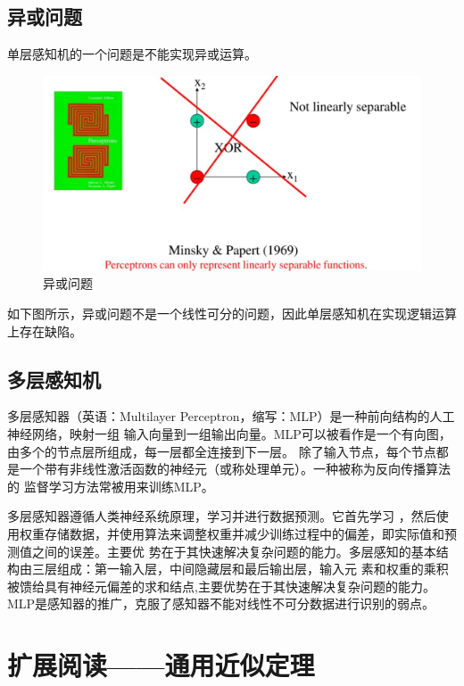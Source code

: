 \section{异或问题}

单层感知机的一个问题是不能实现异或运算。

\begin{figure}[H]
    \centering
    \includegraphics[scale=0.2]{figures/xor.png}
    \caption{异或问题}
\end{figure}

如下图所示，异或问题不是一个线性可分的问题，因此单层感知机在实现逻辑运算上存在缺陷。


\section{多层感知机}

多层感知器（英语：Multilayer Perceptron，缩写：MLP）是一种前向结构的人工神经网络，映射一组
输入向量到一组输出向量。MLP可以被看作是一个有向图，由多个的节点层所组成，每一层都全连接到下一层。
除了输入节点，每个节点都是一个带有非线性激活函数的神经元（或称处理单元）。一种被称为反向传播算法的
监督学习方法常被用来训练MLP。

多层感知器遵循人类神经系统原理，学习并进行数据预测。它首先学习
，然后使用权重存储数据，并使用算法来调整权重并减少训练过程中的偏差，即实际值和预测值之间的误差。主要优
势在于其快速解决复杂问题的能力。多层感知的基本结构由三层组成：第一输入层，中间隐藏层和最后输出层，输入元
素和权重的乘积被馈给具有神经元偏差的求和结点,主要优势在于其快速解决复杂问题的能力。
MLP是感知器的推广，克服了感知器不能对线性不可分数据进行识别的弱点。


\chapter{扩展阅读——通用近似定理}

